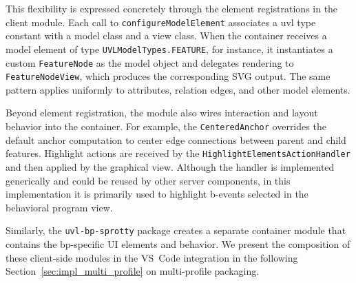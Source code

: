 This flexibility is expressed concretely through the element registrations in the client module.
Each call to \texttt{configureModelElement} associates a \gls{uvl} type constant with a model class and a view class.
When the container receives a model element of type \texttt{UVLModelTypes.FEATURE}, for instance, it instantiates a custom \texttt{FeatureNode} as the model object and delegates rendering to \texttt{FeatureNodeView}, which produces the corresponding SVG output.
The same pattern applies uniformly to attributes, relation edges, and other model elements.

Beyond element registration, the module also wires interaction and layout behavior into the container.
For example, the \texttt{CenteredAnchor} overrides the default anchor computation to center edge connections between parent and child features.
Highlight actions are received by the \texttt{HighlightElementsActionHandler} and then applied by the graphical view.
Although the handler is implemented generically and could be reused by other server components, in this implementation it is primarily used to highlight b-events selected in the behavioral program view.

Similarly, the \texttt{uvl-bp-sprotty} package creates a separate container module that contains the \gls{bp}-specific UI elements and behavior.
We present the composition of these client-side modules in the VS~Code integration in the following Section~\ref{sec:impl_multi_profile} on multi-profile packaging.